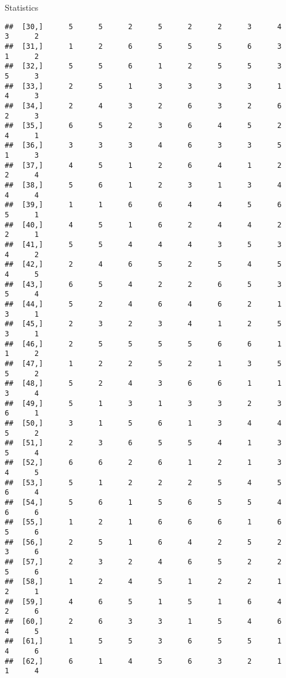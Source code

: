 \documentclass[
  ignorenonframetext,
]{beamer}
\begin{document}
\begin{frame}[fragile]{Statistics}
\begin{verbatim}
##  [30,]      5      5      2      5      2      2      3      4      3      2
##  [31,]      1      2      6      5      5      5      6      3      1      2
##  [32,]      5      5      6      1      2      5      5      3      5      3
##  [33,]      2      5      1      3      3      3      3      1      4      3
##  [34,]      2      4      3      2      6      3      2      6      2      3
##  [35,]      6      5      2      3      6      4      5      2      4      1
##  [36,]      3      3      3      4      6      3      3      5      1      3
##  [37,]      4      5      1      2      6      4      1      2      2      4
##  [38,]      5      6      1      2      3      1      3      4      4      4
##  [39,]      1      1      6      6      4      4      5      6      5      1
##  [40,]      4      5      1      6      2      4      4      2      2      1
##  [41,]      5      5      4      4      4      3      5      3      4      2
##  [42,]      2      4      6      5      2      5      4      5      4      5
##  [43,]      6      5      4      2      2      6      5      3      5      4
##  [44,]      5      2      4      6      4      6      2      1      3      1
##  [45,]      2      3      2      3      4      1      2      5      3      1
##  [46,]      2      5      5      5      5      6      6      1      1      2
##  [47,]      1      2      2      5      2      1      3      5      5      2
##  [48,]      5      2      4      3      6      6      1      1      3      4
##  [49,]      5      1      3      1      3      3      2      3      6      1
##  [50,]      3      1      5      6      1      3      4      4      5      2
##  [51,]      2      3      6      5      5      4      1      3      5      4
##  [52,]      6      6      2      6      1      2      1      3      4      5
##  [53,]      5      1      2      2      2      5      4      5      6      4
##  [54,]      5      6      1      5      6      5      5      4      6      6
##  [55,]      1      2      1      6      6      6      1      6      5      6
##  [56,]      2      5      1      6      4      2      5      2      3      6
##  [57,]      2      3      2      4      6      5      2      2      5      6
##  [58,]      1      2      4      5      1      2      2      1      2      1
##  [59,]      4      6      5      1      5      1      6      4      2      6
##  [60,]      2      6      3      3      1      5      4      6      4      5
##  [61,]      1      5      5      3      6      5      5      1      4      6
##  [62,]      6      1      4      5      6      3      2      1      1      4

\end{verbatim}
\end{frame}
\end{document}
